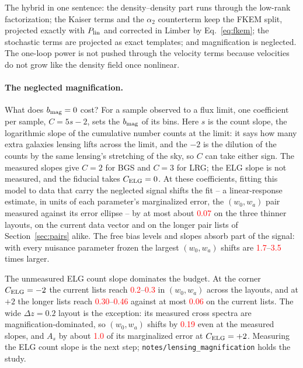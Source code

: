 \documentclass[11pt]{article}
\newif\ifnumbersfinal
\newcommand{\refresh}[1]{\ifnumbersfinal#1\else\textcolor{red}{#1}\fi}
\newcommand{\MagFid}{\refresh{0.07}}
\newcommand{\MagPlusPairMin}{\refresh{0.30}}
\newcommand{\MagPlusPairMax}{\refresh{0.46}}
\newcommand{\MagPlusPaperMax}{\refresh{0.06}}
\newcommand{\MagMinusPaperMin}{\refresh{0.2}}
\newcommand{\MagMinusPaperMax}{\refresh{0.3}}
\newcommand{\MagTwenty}{\refresh{0.19}}
\newcommand{\MagTwentyAs}{\refresh{1.0}}
\newcommand{\MagFrozenMin}{\refresh{1.7}}
\newcommand{\MagFrozenMax}{\refresh{3.5}}
\begin{document}
The hybrid in one sentence: the density--density part runs through the
low-rank factorization; the Kaiser terms and the $\alpha_2$
counterterm keep the FKEM split, projected exactly with
$P_{\rm lin}$ and corrected in Limber by Eq.~\eqref{eq:fkem}; the
stochastic terms are projected as exact templates; and magnification
is neglected.  The one-loop power is not pushed through the velocity
terms because velocities do not grow like the density field once
nonlinear.

\paragraph{The neglected magnification.}
What does $b_{\rm mag} = 0$ cost?  For a sample observed to a flux
limit, one coefficient per sample, $C = 5s - 2$, sets the
$b_{\rm mag}$ of its bins.  Here $s$ is the count slope, the
logarithmic slope of the cumulative number counts at the limit: it
says how many extra galaxies lensing lifts across the limit, and
the $-2$ is the dilution of the counts by the same lensing's
stretching of the sky, so $C$ can take either sign.  The measured
slopes give $C = 2$ for BGS and $C = 3$ for LRG; the ELG slope is
not measured, and the fiducial takes $C_{\rm ELG} = 0$.  At these
coefficients, fitting this model to data that carry the neglected
signal shifts the fit -- a linear-response estimate, in units of
each parameter's marginalized error, the $(w_0, w_a)$ pair measured
against its error ellipse -- by at most about \MagFid{} on the
three thinner layouts, on the current data vector and on the longer
pair lists of Section~\ref{sec:pairs} alike.  The free bias levels
and slopes absorb part of the signal: with every nuisance parameter
frozen the largest $(w_0, w_a)$ shifts are
\MagFrozenMin{}--\MagFrozenMax{} times larger.

The unmeasured ELG count slope dominates the budget.  At the corner
$C_{\rm ELG} = -2$ the current lists reach
\MagMinusPaperMin{}--\MagMinusPaperMax{} in $(w_0, w_a)$ across the
layouts, and at $+2$ the longer lists reach
\MagPlusPairMin{}--\MagPlusPairMax{} against at most
\MagPlusPaperMax{} on the current lists.  The wide
$\Delta z = 0.2$ layout is the exception: its measured cross
spectra are magnification-dominated, so $(w_0, w_a)$ shifts by
\MagTwenty{} even at the measured slopes, and $A_s$ by about
\MagTwentyAs{} of its marginalized error at $C_{\rm ELG} = +2$.
Measuring the ELG count slope is the next step;
\texttt{notes/lensing\_magnification} holds the study.
\end{document}
